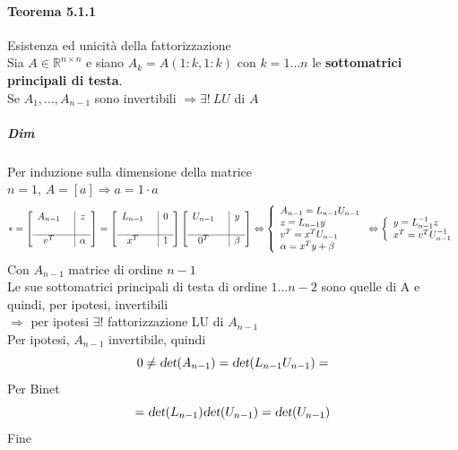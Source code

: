 \documentclass[10pt]{book}
\begin{document}
\paragraph{Teorema 5.1.1} Esistenza ed unicità della fattorizzazione\\
Sia $A \in \mathbb{R}^{n \times n}$ e siano $A_k = A(1:k, 1:k)$ con $k = 1\ldots n$ le \textbf{sottomatrici principali di testa}.\\
Se $A_1, \ldots, A_{n-1}$ sono invertibili $\Rightarrow\exists !\: LU$ di $A$
\subparagraph{Dim} Per induzione sulla dimensione della matrice\\
$n = 1$, $A = [a] \Rightarrow a = 1\cdot a$
$$* = \left[ 
\begin{array}{c c | c}
	A_{n-1} & & z\\
	& &\\
	\hline
	v^T & & \alpha
\end{array}
\right]
= \left[ 
\begin{array}{c c | c}
	L_{n-1} & & 0\\
	& &\\
	\hline
	x^T & & 1
\end{array}
\right]
\left[ 
\begin{array}{c c | c}
	U_{n-1} & & y\\
	& &\\
	\hline
	0^T & & \beta
\end{array}
\right]
\Leftrightarrow
\left\{
\begin{array}{l}
A_{n-1} = L_{n-1}U_{n-1}\\
z = L_{n-1}y\\
v^T = x^T U_{n-1}\\
\alpha = x^T y + \beta
\end{array}
\right.
\Leftrightarrow
\left\{
\begin{array}{l}
y = L_{n-1}^{-1}z\\
x^T = v^T U_{n-1}^{-1}\\
\end{array}
\right.
$$
Con $A_{n-1}$ matrice di ordine $n - 1$\\
Le sue sottomatrici principali di testa di ordine $1\ldots n-2$ sono quelle di A e quindi, per ipotesi, invertibili\\
$\Rightarrow$ per ipotesi $\exists !$ fattorizzazione LU di $A_{n-1}$\\
Per ipotesi, $A_{n-1}$ invertibile, quindi
$$0 \neq \textsl{det}(A_{n-1}) = \textsl{det}(L_{n-1}U_{n-1}) =$$
Per Binet
$$ = \textsl{det}(L_{n-1})\textsl{det}(U_{n-1}) = \textsl{det}(U_{n-1})$$
Fine
\end{document}
